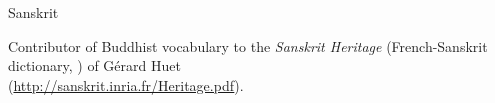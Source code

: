 \documentclass[a4paper,11pt]{article}
\begin{document}
\noindent Sanskrit

\begin{itemize*}

  \item Contributor of Buddhist vocabulary to the \emph{Sanskrit
  Heritage} (French-Sanskrit dictionary, ) of
    Gérard Huet\\ (\url{http://sanskrit.inria.fr/Heritage.pdf}).

\end{itemize*}
\end{document}
